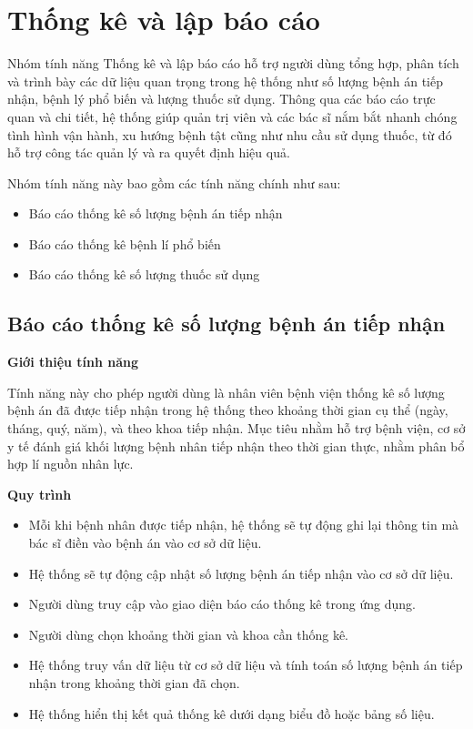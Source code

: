 \section{Thống kê và lập báo cáo}

Nhóm tính năng Thống kê và lập báo cáo hỗ trợ người dùng tổng hợp, phân tích và trình bày các dữ liệu quan trọng trong hệ thống như số lượng bệnh án tiếp nhận, bệnh lý phổ biến và lượng thuốc sử dụng. Thông qua các báo cáo trực quan và chi tiết, hệ thống giúp quản trị viên và các bác sĩ nắm bắt nhanh chóng tình hình vận hành, xu hướng bệnh tật cũng như nhu cầu sử dụng thuốc, từ đó hỗ trợ công tác quản lý và ra quyết định hiệu quả.

Nhóm tính năng này bao gồm các tính năng chính như sau:
\begin{itemize}
  \item Báo cáo thống kê số lượng bệnh án tiếp nhận
  \item Báo cáo thống kê bệnh lí phổ biến
  \item Báo cáo thống kê số lượng thuốc sử dụng
\end{itemize}

\subsection{Báo cáo thống kê số lượng bệnh án tiếp nhận}

\noindent \textbf{Giới thiệu tính năng}

Tính năng này cho phép người dùng là nhân viên bệnh viện thống kê số lượng bệnh án đã được tiếp nhận trong hệ thống theo khoảng thời gian cụ thể (ngày, tháng, quý, năm), và theo khoa tiếp nhận. Mục tiêu nhằm hỗ trợ bệnh viện, cơ sở y tế đánh giá khối lượng bệnh nhân tiếp nhận theo thời gian thực, nhằm phân bổ hợp lí nguồn nhân lực.

\noindent \textbf{Quy trình}

\begin{itemize}
  \item Mỗi khi bệnh nhân được tiếp nhận, hệ thống sẽ tự động ghi lại thông tin mà bác sĩ điền vào bệnh án vào cơ sở dữ liệu.
  \item Hệ thống sẽ tự động cập nhật số lượng bệnh án tiếp nhận vào cơ sở dữ liệu.
  \item Người dùng truy cập vào giao diện báo cáo thống kê trong ứng dụng.
  \item Người dùng chọn khoảng thời gian và khoa cần thống kê.
  \item Hệ thống truy vấn dữ liệu từ cơ sở dữ liệu và tính toán số lượng bệnh án tiếp nhận trong khoảng thời gian đã chọn.
  \item Hệ thống hiển thị kết quả thống kê dưới dạng biểu đồ hoặc bảng số liệu.
\end{itemize}

